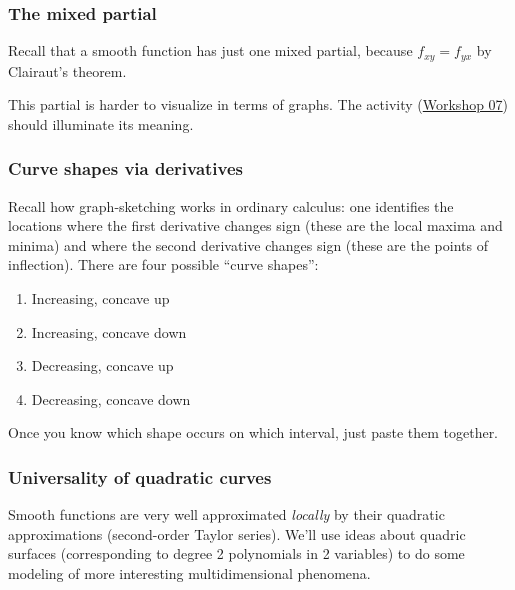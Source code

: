 \documentclass[11pt,ignorenonframetext,]{beamer}
\begin{document}
\begin{frame}\frametitle{The mixed partial}

Recall that a smooth function has just one mixed partial, because
$f_{xy} = f_{yx}$ by Clairaut's theorem.

This partial is harder to visualize in terms of graphs. The activity
(\href{../../workshops/07/Workshop.pdf}{Workshop 07}) should illuminate
its meaning.

\end{frame}

\begin{frame}\frametitle{Curve shapes via derivatives}

Recall how graph-sketching works in ordinary calculus: one identifies
the locations where the first derivative changes sign (these are the
local maxima and minima) and where the second derivative changes sign
(these are the points of inflection). There are four possible ``curve
shapes'':

\begin{enumerate}[<+->]
\def\labelenumi{\arabic{enumi}.}
\itemsep1pt\parskip0pt
\item
  Increasing, concave up
\item
  Increasing, concave down
\item
  Decreasing, concave up
\item
  Decreasing, concave down
\end{enumerate}

Once you know which shape occurs on which interval, just paste them
together.

\end{frame}

\begin{frame}\frametitle{Universality of quadratic curves}

Smooth functions are very well approximated \emph{locally} by their
quadratic approximations (second-order Taylor series). We'll use ideas
about quadric surfaces (corresponding to degree 2 polynomials in 2
variables) to do some modeling of more interesting multidimensional
phenomena.

\end{frame}
\end{document}
